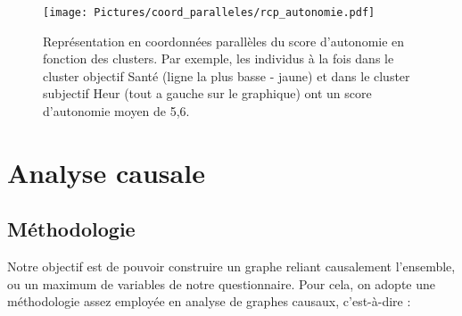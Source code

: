 \documentclass[11pt,fleqn,a4paper,openany,frenchb]{book} %
\begin{document}

\begin{figure}[!h]
\centering
\texttt{[image: Pictures/coord\_paralleles/rcp\_autonomie.pdf]}
\caption{Représentation en coordonnées parallèles du score d'autonomie en fonction des clusters. Par exemple, les individus à la fois dans le cluster objectif Santé (ligne la plus basse - jaune) et dans le cluster subjectif Heur (tout a gauche sur le graphique) ont un score d'autonomie moyen de 5,6.}
\label{fig:rcpautonomie}
\end{figure}


\chapter{Analyse causale}
\section{Méthodologie}
Notre objectif est de pouvoir construire un graphe reliant causalement l'ensemble, ou un maximum de variables de notre questionnaire. Pour cela, on adopte %
une méthodologie assez employée en analyse de graphes causaux, c'est-à-dire :
\end{document}
